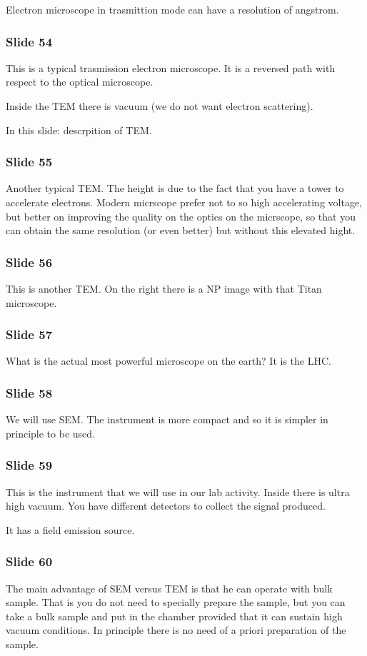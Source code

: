 \documentclass[../main/main.tex]{subfiles}
\begin{document}
Electron microscope in trasmittion mode can have a resolution of angstrom.

\subsubsection{Slide 54}
This is a typical trasmission electron microscope.
It is a reversed path with respect to the optical microscope.

Inside the TEM there is vacuum (we do not want electron scattering).

In this slide: descrpition of TEM.

\subsubsection{Slide 55}
Another typical TEM. The height is due to the fact that you have a tower to accelerate electrons.
Modern micrscope prefer not to so high accelerating voltage, but better on improving the quality on the optics on the micrscope, so that you can obtain the same resolution (or even better) but without this elevated hight.


\subsubsection{Slide 56}
This is another TEM. On the right there is a NP image with that Titan microscope.

\subsubsection{Slide 57}
What is the actual most powerful microscope on the earth? It is the LHC.

\subsubsection{Slide 58}
We will use SEM. The instrument is more compact and so it is simpler in principle to be used.

\subsubsection{Slide 59}
This is the instrument that we will use in our lab activity.
Inside there is ultra high vacuum.
You have different detectors to collect the signal produced.

It has a field emission source.

\subsubsection{Slide 60}
The main advantage of SEM versus TEM is that he can operate with bulk sample. That is you do not need to specially prepare the sample, but you can take a bulk sample and put in the chamber provided that it can sustain high vacuum conditions. In principle there is no need of a priori preparation of the sample.
\end{document}

